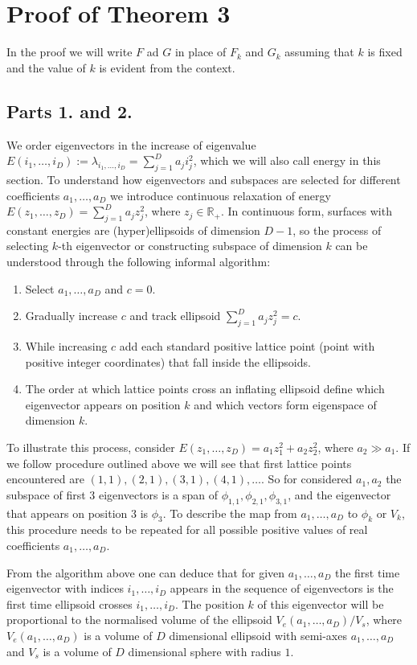 \documentclass{article}
\begin{document}
\section{Proof of Theorem 3}
\label{appendix:theorem_3}
In the proof we will write $F$ ad $G$ in place of $F_{k}$ and $G_{k}$ assuming that $k$ is fixed and the value of $k$ is evident from the context.
\subsection{Parts 1. and 2.}
We order eigenvectors in the increase of eigenvalue $E(i_1,\dots, i_D) := \lambda_{i_1,\dots,i_D} = \sum_{j=1}^{D}a_{j}i_{j}^2$, which we will also call energy in this section. To understand how eigenvectors and subspaces are selected for different coefficients $a_1,\dots, a_D$ we introduce continuous relaxation of energy $E(z_1,\dots, z_D) = \sum_{j=1}^{D}a_{j}z_{j}^2$, where $z_j \in\mathbb{R}_{+}$. In continuous form, surfaces with constant energies are (hyper)ellipsoids of dimension $D-1$, so the process of selecting $k$-th eigenvector or constructing subspace of dimension $k$ can be understood through the following informal algorithm:
\begin{enumerate}
	\item Select $a_1,\dots, a_{D}$ and $c = 0$.
	\item Gradually increase $c$ and track ellipsoid $\sum_{j=1}^{D}a_{j}z_{j}^2 = c$.
	\item While increasing $c$ add each standard positive lattice point (point with positive integer coordinates) that fall inside the ellipsoids.
	\item The order at which lattice points cross an inflating ellipsoid define which eigenvector appears on position $k$ and which vectors form eigenspace of dimension $k$.
\end{enumerate}
To illustrate this process, consider $E(z_1,\dots, z_D) = a_1 z_1^2 + a_2 z_2^2$, where $a_2 \gg a_1$. If we follow procedure outlined above we will see that first lattice points encountered are $(1, 1), (2, 1), (3, 1), (4, 1), \dots$. So for considered $a_1, a_2$ the subspace of first $3$ eigenvectors is a span of $\phi_{1, 1}, \phi_{2, 1}, \phi_{3, 1}$, and the eigenvector that appears on position $3$ is $\phi_3$. To describe the map from $a_1,\dots, a_D$ to $\phi_k$ or $V_k$, this procedure needs to be repeated for all possible positive values of real coefficients $a_1,\dots, a_D$.

From the algorithm above one can deduce that for given $a_1,\dots, a_D$ the first time eigenvector with indices $i_1, \dots, i_D$ appears in the sequence of eigenvectors is the first time ellipsoid crosses $i_1, \dots, i_D$. The position $k$ of this eigenvector will be proportional to the normalised volume of the ellipsoid $V_{e}(a_1,\dots, a_D) \big/ V_{s}$, where $V_{e}(a_1,\dots, a_D)$ is a volume of $D$ dimensional ellipsoid with semi-axes $a_1,\dots, a_D$ and $V_{s}$ is a volume of $D$ dimensional sphere with radius $1$.
\end{document}

